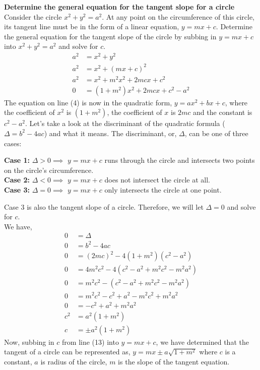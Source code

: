 \documentclass[12pt]{book}
\begin{document}
\begin{enumerate}
\textbf{Determine the general equation for the tangent slope for a circle}\\
Consider the circle $x^2+y^2=a^2$. At any point on the circumference of this circle, its tangent line must be in the form of a linear equation, $y=mx+c$. Determine the general equation for the tangent slope of the circle by subbing in $y=mx+c$ into $x^2+y^2=a^2$ and solve for $c$.
\begin{align}
    a^2 &= x^2 + y^2 \\
    a^2 &= x^2 + (mx+c)^2 \\
    a^2 &= x^2 + m^2x^2 + 2mcx + c^2 \\
    0 &= (1+m^2)x^2 + 2mcx + c^2 - a^2
\end{align}
The equation on line (4) is now in the quadratic form, $y=ax^2+bx+c$, where the coefficient of $x^2$ is $(1+m^2)$, the coefficient of $x$ is $2mc$ and the constant is $c^2-a^2$. Let's take a look at the discriminant of the quadratic formula ($\Delta = b^2-4ac$) and what it means. The discriminant, or, $\Delta$, can be one of three cases:

\textbf{Case 1:} $\Delta > 0\implies$  $y=mx+c$ runs through the circle and intersects two points on the circle's circumference.\\
\textbf{Case 2:} $\Delta < 0\implies$ $y=mx+c$ does not intersect the circle at all.\\
\textbf{Case 3:} $\Delta = 0\implies$ $y=mx+c$ only intersects the circle at one point.

Case 3 is also the tangent slope of a circle. Therefore, we will let $\Delta = 0$ and solve for $c$.\\

We have,
\begin{align}
    0 &= \Delta \\
    0 &= b^2 - 4ac \\
    0 &= (2mc)^2 - 4(1+m^2)(c^2-a^2) \\
    0 &= 4m^2c^2 - 4(c^2-a^2+m^2c^2-m^2a^2) \\
    0 &= m^2c^2 - (c^2-a^2+m^2c^2-m^2a^2) \\
    0 &= m^2c^2 - c^2+a^2-m^2c^2+m^2a^2 \\
    0 &=  - c^2+a^2+m^2a^2 \\
    c^2 &= a^2(1+m^2) \\
    c &= \pm a^2(1+m^2)
\end{align}
Now, subbing in $c$ from line (13) into $y=mx+c$, we have determined that the tangent of a circle can be represented as, $y = mx \pm a\sqrt{1+m^2}$ where $c$ is a constant, $a$ is radius of the circle, $m$ is the slope of the tangent equation.


\end{enumerate}
\end{document}
